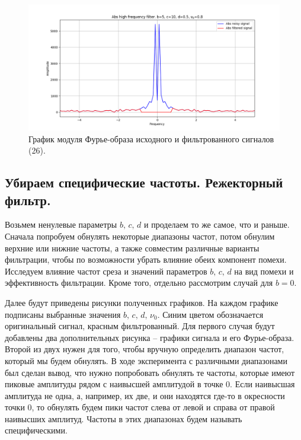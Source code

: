 \documentclass[a4paper, 12pt]{article}
\begin{document}
    \begin{figure}[!htb]
        \centering
        \includegraphics[scale=0.48]{26_abs_u_U_nolow.png}
        \captionsetup{skip=0pt}
        \caption{График модуля Фурье-образа исходного и фильтрованного сигналов (26).}
        \label{fig:fig_56456}
    \end{figure}
    \newpage


    \subsection{Убираем специфические частоты. Режекторный фильтр.}
    Возьмем ненулевые параметры $b,\,c,\,d$ и проделаем то же самое, что и раньше. Сначала попробуем
    обнулять некоторые диапазоны частот, потом обнулим верхние или нижние частоты, а также
    совместим различные варианты фильтрации, чтобы по возможности убрать влияние обеих компонент помехи.
    Исследуем влияние частот среза и значений параметров $b,\,c,\,d$ на вид помехи и эффективность
    фильтрации. Кроме того, отдельно рассмотрим случай для $b=0$.


    Далее будут приведены рисунки полученных графиков. На каждом графике подписаны выбранные значения $b,\,c,\,d,\,\nu_0$. 
    Синим цветом обозначается оригинальный сигнал, красным фильтрованный. Для первого случая будут
    добавлены два дополнительных рисунка -- графики сигнала и его Фурье-образа. Второй из двух нужен для того, чтобы вручную определить
    диапазон частот, который мы будем обнулять. В ходе эксперимента с различными диапазонами был сделан вывод, что нужно попробовать
    обнулять те частоты, которые имеют пиковые амплитуды рядом с наивысшей амплитудой в точке 0. Если наивысшая амплитуда не одна, а, например,
    их две, и они находятся где-то в окресности точки 0, то обнулять будем пики частот слева от левой и справа от правой наивысших амплитуд.
    Частоты в этих диапазонах будем называть специфическими.
\end{document}
